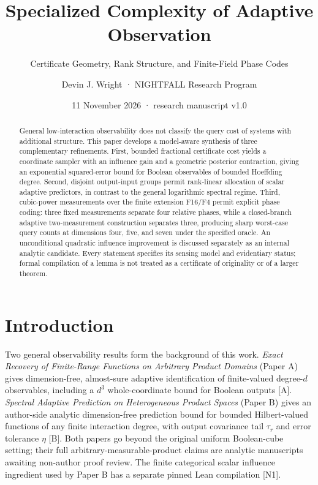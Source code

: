 \documentclass[
  10pt,
]{article}
\title{Specialized Complexity of Adaptive Observation}
\subtitle{Certificate Geometry, Rank Structure, and Finite-Field Phase
Codes}
\author{Devin J. Wright · NIGHTFALL Research Program}
\date{11 November 2026 · research manuscript v1.0}
\begin{document}
\maketitle
\begin{abstract}
General low-interaction observability does not classify the query cost
of systems with additional structure. This paper develops a model-aware
synthesis of three complementary refinements. First, bounded fractional
certificate cost yields a coordinate sampler with an influence gain and
a geometric posterior contraction, giving an exponential squared-error
bound for Boolean observables of bounded Hoeffding degree. Second,
disjoint output-input groups permit rank-linear allocation of scalar
adaptive predictors, in contrast to the general logarithmic spectral
regime. Third, cubic-power measurements over the finite extension F16/F4
permit explicit phase coding: three fixed measurements separate four
relative phases, while a closed-branch adaptive two-measurement
construction separates three, producing sharp worst-case query counts at
dimensions four, five, and seven under the specified oracle. An
unconditional quadratic influence improvement is discussed separately as
an internal analytic candidate. Every statement specifies its sensing
model and evidentiary status; formal compilation of a lemma is not
treated as a certificate of originality or of a larger theorem.
\end{abstract}

\section{Introduction}\label{introduction}

Two general observability results form the background of this work.
\emph{Exact Recovery of Finite-Range Functions on Arbitrary Product
Domains} (Paper A) gives dimension-free, almost-sure adaptive
identification of finite-valued degree-\(d\) observables, including a
\(d^3\) whole-coordinate bound for Boolean outputs {[}A{]}.
\emph{Spectral Adaptive Prediction on Heterogeneous Product Spaces}
(Paper B) gives an author-side analytic dimension-free prediction bound
for bounded Hilbert-valued functions of any finite interaction degree,
with output covariance tail \(\tau_r\) and error tolerance \(\eta\)
{[}B{]}. Both papers go beyond the original uniform Boolean-cube
setting; their full arbitrary-measurable-product claims are analytic
manuscripts awaiting non-author proof review. The finite categorical
scalar influence ingredient used by Paper B has a separate pinned Lean
compilation {[}N1{]}.
\end{document}
